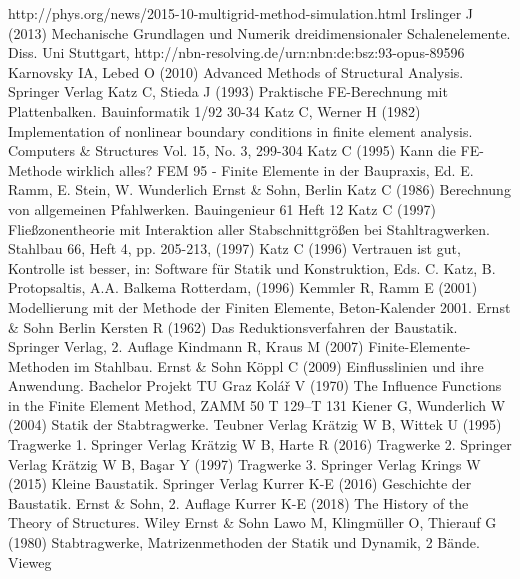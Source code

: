 \begin{thebibliography}{}
 http://phys.org/news/2015-10-multigrid-method-simulation.html
 Irslinger J (2013) Mechanische Grundlagen und Numerik dreidimensionaler Schalenelemente. Diss. Uni Stuttgart, http://nbn-resolving.de/urn:nbn:de:bsz:93-opus-89596
 Karnovsky IA, Lebed O (2010) Advanced Methods of Structural Analysis. Springer Verlag
 Katz C, Stieda J (1993) \lqq Praktische FE-Berechnung mit Plattenbalken\rqq. Bauinformatik 1/92 30-34
 Katz C, Werner H (1982) \lqq Implementation of nonlinear boundary conditions in
finite element analysis\rqq. Computers \& Structures Vol. 15, No. 3, 299-304
 Katz C (1995) \lqq Kann die FE-Methode wirklich alles?\rqq
    FEM 95 - Finite Elemente in der Baupraxis, Ed. E. Ramm, E. Stein, W. Wunderlich
    Ernst \& Sohn, Berlin
 Katz C (1986) \lqq Berechnung von allgemeinen Pfahlwerken\rqq. Bauingenieur 61 Heft 12
 Katz C (1997) \lqq Flie{\ss}zonentheorie mit Interaktion aller Stabschnittgr\"{o}{\ss}en bei Stahltragwerken\rqq.
 Stahlbau 66, Heft 4, pp. 205-213, (1997)
 Katz C (1996) \lqq  Vertrauen ist gut, Kontrolle ist besser\rqq, in:
Software f\"{u}r Statik und Konstruktion, Eds. C. Katz, B. Protopsaltis, A.A. Balkema
Rotterdam, (1996)
 Kemmler R, Ramm E (2001) \lqq Modellierung mit der Methode der Finiten Elemente\rqq, Beton-Kalender 2001. Ernst \& Sohn Berlin
 Kersten R (1962) Das Reduktionsverfahren der Baustatik. Springer Verlag, 2. Auflage
 Kindmann R, Kraus M (2007) Finite-Elemente-Methoden im Stahlbau. Ernst \& Sohn
 K\"{o}ppl C (2009) Einflusslinien und ihre Anwendung. Bachelor Projekt TU Graz
 Kol\'{a}\v{r} V (1970) \lqq The Influence Functions in the Finite Element Method\rqq, ZAMM 50 T 129--T 131\label{Korrektur13}
 Kiener G, Wunderlich W (2004) Statik der Stabtragwerke. Teubner Verlag
 Kr\"{a}tzig W B,  Wittek U (1995) Tragwerke 1. Springer Verlag
 Kr\"{a}tzig W B, Harte R (2016)  Tragwerke 2. Springer Verlag
 Kr\"{a}tzig W B, Ba\c{s}ar Y (1997) Tragwerke 3. Springer Verlag
 Krings W (2015) Kleine Baustatik. Springer Verlag
 Kurrer K-E (2016) Geschichte der Baustatik. Ernst \& Sohn, 2. Auflage
 Kurrer K-E (2018) The History of the Theory of Structures. Wiley Ernst \& Sohn
 Lawo M, Klingm\"{u}ller O, Thierauf G (1980) Stabtragwerke, Matrizenmethoden der Statik und Dynamik, 2 B\"{a}nde. Vieweg

\end{thebibliography}
